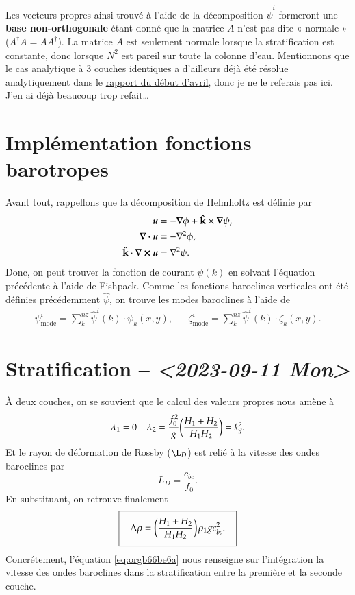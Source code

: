 \documentclass[10pt]{article}
\numberwithin{equation}{section}
\newcommand{\kvf}{\vb{\hat{k}}}
\newcommand{\uu}{\vb*{u}}
\newcommand{\pt}{\hspace{1pt}}
\newcommand{\venti}{\vphantom{\sum_x^x}}
\begin{document}
Les vecteurs propres ainsi trouvé à l'aide de la décomposition \(\hat{\psi}^i\) formeront une \textbf{base non-orthogonale} étant donné que la matrice \(A\) n'est pas dite « normale » (\(A^\dagger A = A A^\dagger\)).
La matrice \(A\) est seulement normale lorsque la stratification est constante, donc lorsque
\(N^2\) est pareil sur toute la colonne d'eau.
Mentionnons que le cas analytique à 3 couches identiques a d'ailleurs déjà été résolue analytiquement dans le \href{rapport-2023-04-07.pdf}{rapport du début d'avril}, donc je ne le referais pas ici.
J'en ai déjà beaucoup trop refait\ldots{}

\section{Implémentation fonctions barotropes}
\label{sec:org2499bab}
Avant tout, rappellons que la décomposition de Helmholtz est définie par
\begin{subequations}
\begin{align}
   \uu &= -\gradient{\phi} + \kvf \times \gradient{\psi},\\
   \divergence{\uu} &= -\laplacian{\phi},\\
   \kvf\cdot\curl{\uu} &= \laplacian{\psi}.
\end{align}
\end{subequations}
Donc, on peut trouver la fonction de courant \(\psi(k)\) en solvant l'équation précédente à l'aide de Fishpack.
Comme les fonctions baroclines verticales ont été définies précédemment \(\hat{\psi}\), on trouve les modes baroclines à l'aide de
\begin{align}
   &&\psi_\text{mode}^i = \sum_k^{nz} \hat{\psi}^i(k)\cdot  \psi_k(x,y),
   &&\zeta_\text{mode}^i = \sum_k^{nz} \hat{\psi}^i(k)\cdot  \zeta_k(x,y).&&
\end{align}



\section{Stratification -- \textit{<2023-09-11 Mon>}}
\label{sec:org9f2c5db}
À deux couches, on se souvient que le calcul des valeurs propres nous amène à
\begin{align}
   && \lambda_1 = 0 && \lambda_2 = \frac{f_0^2}{g} \qty(\frac{H_1+H_2}{H_1 H_2}) = k_d^2. &&
\end{align}
Et le rayon de déformation de Rossby (\(\L_D\)) est relié à la vitesse des ondes baroclines par
\begin{equation}
   L_D = \frac{c_{bc}}{f_0}.
\end{equation}
En substituant, on retrouve finalement
\begin{equation}
\label{eq:orgb66be6a}
   \boxed{\hspace{0.3cm}\Delta\rho = \qty(\frac{H_1+H_2}{H_1H_2})\pt\rho_1 g c_{bc}^2.\venti\hspace{0.3cm}}
\end{equation}
Concrétement, l'équation \ref{eq:orgb66be6a} nous renseigne sur l'intégration la vitesse des ondes baroclines dans la stratification entre la première et la seconde couche.
\end{document}
